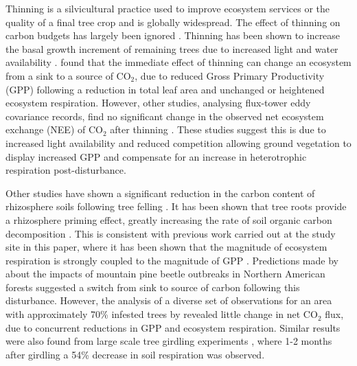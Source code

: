 \documentclass[draft,linenumbers]{agujournal}
\begin{document}
Thinning is a silvicultural practice used to improve ecosystem services or the quality of a final tree crop and is globally widespread. The effect of thinning on carbon budgets has largely been ignored \citep{JGRG:JGRG779}. {\color{blue}Thinning has been shown to increase the basal growth increment of remaining trees due to increased light and water availability \citep{breda95thin, martin2010response}. \citet{Misson2005207} found that the immediate effect of thinning can change an ecosystem from a sink to a source of CO$_{2}$, due to reduced Gross Primary Productivity (GPP) following a reduction in total leaf area and unchanged or heightened ecosystem respiration}. However, other studies, analysing flux-tower eddy covariance records, find no significant change in the observed net ecosystem exchange (NEE) of CO\(_{2}\) after thinning \citep{vesala2005effect, moreaux2011paired,  dore2012recovery, Saunders20121, wilkinson2015effects}. These studies suggest this is due to increased light availability and reduced competition allowing ground vegetation to display increased GPP and compensate for an increase in heterotrophic respiration post-disturbance.  

Other studies have shown a significant reduction in the carbon content of rhizosphere soils following tree felling \citep{Hernesmaa2005777}. It has been shown that tree roots provide a rhizosphere priming effect, greatly increasing the rate of soil organic carbon decomposition \citep{ELE:ELE1095}. This is consistent with previous work carried out at the study site in this paper, where it has been shown that the magnitude of ecosystem respiration is strongly coupled to the magnitude of GPP \citep{heinemeyer2012exploring}. Predictions made by \citet{kurz2008mountain} about the impacts of mountain pine beetle outbreaks in Northern American forests suggested a switch from sink to source of carbon following this disturbance. However, the analysis of a diverse set of observations for an area with approximately 70\% infested trees by \citet{ELE:ELE12097} revealed little change in net CO\(_{2}\) flux, due to concurrent reductions in GPP and ecosystem respiration. Similar results were also found from large scale tree girdling experiments \citep{hogberg2001large}, where 1-2 months after girdling a 54\% decrease in soil respiration was observed.
\end{document}
